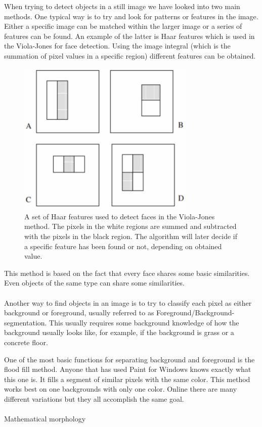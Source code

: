 When trying to detect objects in a still image we have looked into two main methods. One typical way is to try and look for patterns or features in the image.
Either a specific image can be matched within the larger image or a series of features can be found.
An example of the latter is Haar features which is used in the Viola-Jones for face detection. Using the image integral (which is the summation of pixel values in a specific region) different features can be obtained.

\begin{figure}[hbtp]
\begin{center}
\includegraphics[width = 0.75\textwidth]{./Images/viola-jones.jpg} 
\caption{A set of Haar features used to detect faces in the Viola-Jones method. The pixels in the white regions are summed and subtracted with the pixels in the black region. The algorithm will later decide if a specific feature has been found or not, depending on obtained value.}
\end{center}
\end{figure}

This method is based on the fact that every face shares some basic similarities. Even objects of the same type can share some similarities.\cite{violaJones}
\\\\
Another way to find objects in an image is to try to classify each pixel as either background or foreground, usually referred to as Foreground/Background-segmentation. This usually requires some background knowledge of how the background usually looks like, for example, if the background is grass or a concrete floor.

One of the most basic functions for separating background and foreground is the flood fill method.
Anyone that has used Paint for Windows knows exactly what this one is. It fills a segment of similar pixels with the same color. This method works best on one backgrounds with only one color.
Online there are many different variations but they all accomplish the same goal.\cite{floodFill}
\\\\
Mathematical morphology

